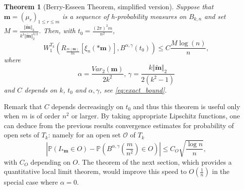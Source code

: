 \documentclass[10pt,11pt]{amsart}%
\newtheorem{theorem}{Theorem}[section]
\begin{document}
\begin{theorem}[Berry-Esseen Theorem, simplified version]\label{thm:Berry-Esseen_simplified}
Suppose that $\mathbf{m}=(\mu_r)_{1\leq r\leq m}$ is a sequence of h-probability measures on $ B_{k,n}$ and set $M=\frac{\Vert \tilde{\mathbf{m}}\Vert_3}{k^3\Vert \tilde{\mathbf{m}}\Vert_2^{3/2}}$. Then, with $t_0=\frac{(2\pi)^2m}{n^2}$,
$$W_1^{ T_{k}}\left(R_{\frac{m\left\langle \mathbf{m}\right\rangle}{kn}}\left[\xi_{n}\left(*\mathbf{m}\right)\right],  B^{\alpha,\gamma}\left(t_0\right)\right)\leq C\frac{M\log(n)}{n},$$
where
$$\alpha=\frac{Var_2(\mathbf{m})}{2k^2},\,\gamma=\frac{k\Vert \tilde{\mathbf{m}}\Vert_2}{2(k^2-1)}$$ 
and $C$ depends on $k$, $t_0$ and $\alpha,\gamma$, see \eqref{eq:exact_bound}. 
\end{theorem}
Remark that $C$ depends decreasingly on $t_0$ and thus this theorem is useful only when $m$ is of order $n^2$ or larger. By taking appropriate Lipschitz functions, one can deduce from the previous results convergence estimates for probability of open sets of $ T_{k}$: namely for an open set $\mathcal{O}$ of $T_k$
$$\left\vert\mathbb{P}\left(I_{*\mathbf{m}}\in O\right)-\mathbb{P}\left(B^{\alpha,\gamma}\left(\frac{m}{n^2}\right)\in O\right)\right\vert\leq C_{O}\sqrt{\frac{\log n}{n}},$$
with $C_O$ depending on $O$. The theorem of the next section, which provides a quantitative local limit theorem, would improve this speed to $O\left(\frac{1}{n}\right)$ in the special case where $\alpha=0$.   
\end{document}
